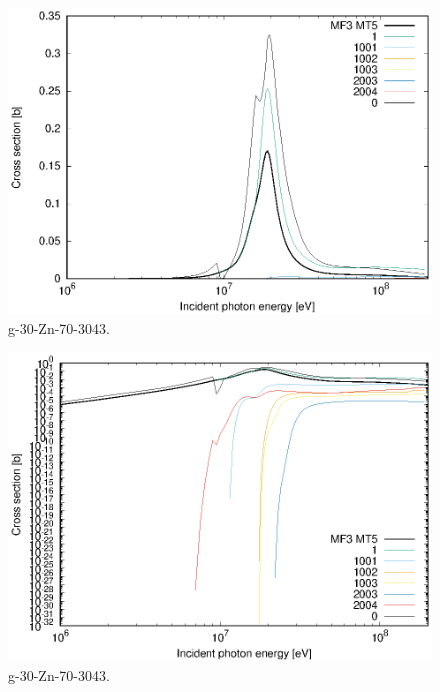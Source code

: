 \begin{figure}
 \includegraphics[width=\linewidth]{eps/g_30-Zn-70_3043.eps}
  \caption{g-30-Zn-70-3043.}
\end{figure}
\begin{figure}
 \includegraphics[width=\linewidth]{eps-log/g_30-Zn-70_3043.eps}
 \caption{g-30-Zn-70-3043.}
\end{figure}
\newpage \clearpage

